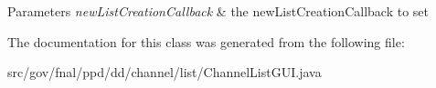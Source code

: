 \begin{DoxyParams}{Parameters}
{\em new\-List\-Creation\-Callback} & the new\-List\-Creation\-Callback to set \\
\hline
\end{DoxyParams}


The documentation for this class was generated from the following file\-:\begin{DoxyCompactItemize}
\item 
src/gov/fnal/ppd/dd/channel/list/Channel\-List\-G\-U\-I.\-java\end{DoxyCompactItemize}
